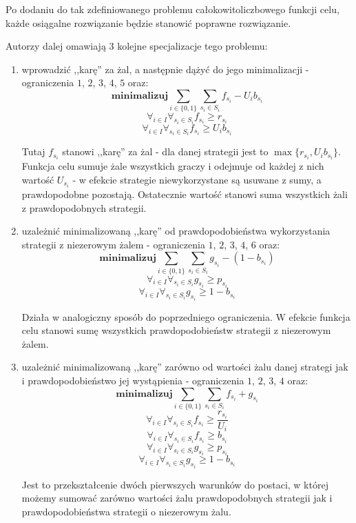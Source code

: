 \documentclass[polish]{standalone}
\begin{document}
Po dodaniu do tak zdefiniowanego problemu całokowitoliczbowego funkcji celu, każde osiągalne rozwiązanie będzie stanowić
poprawne rozwiązanie. \cite[str.~2]{SCG-NE}

Autorzy dalej omawiają 3 kolejne specjalizacje tego problemu:
\begin{enumerate}
\item wprowadzić ,,karę'' za żal, a następnie dążyć do jego minimalizacji - ograniczenia $1$, $2$, $3$, $4$, $5$ oraz:
$$\textbf{minimalizuj} \sum_{i \in \{0,1\}} \sum_{s_i \in S_i} f_{s_i} - U_i b_{s_i}$$
$$\forall_{i \in I} \forall_{s_i \in S_i} f_{s_i} \geq r_{s_i}$$
$$\forall_{i \in I} \forall_{s_i \in S_i} f_{s_i} \geq U_i b_{s_i}$$
\cite[str.~2]{SCG-NE}

Tutaj $f_{s_i}$ stanowi ,,karę'' za żal - dla danej strategii jest to $\max \{ r_{s_i}, U_i b_{s_i} \}$. Funkcja celu
sumuje żale wszystkich graczy i odejmuje od każdej z nich wartość $U_{s_i}$ - w efekcie strategie niewykorzystane są
usuwane z sumy, a prawdopodobne pozostają. Ostatecznie wartość stanowi suma wszystkich żali z prawdopodobnych strategii.
\item uzależnić minimalizowaną ,,karę'' od prawdopodobieństwa wykorzystania strategii z niezerowym żalem - ograniczenia
$1$, $2$, $3$,
$4$, $6$ oraz:
$$\textbf{minimalizuj} \sum_{i \in \{0,1\}} \sum_{s_i \in S_i} g_{s_i} - (1 - b_{s_i})$$
$$\forall_{i \in I} \forall_{s_i \in S_i} g_{s_i} \geq p_{s_i}$$
$$\forall_{i \in I} \forall_{s_i \in S_i} g_{s_i} \geq 1 - b_{s_i}$$
\cite[str.~2]{SCG-NE}

Działa w analogiczny sposób do poprzedniego ograniczenia. W efekcie funkcja celu stanowi sumę wszystkich
prawdopodobieństw strategii z niezerowym żalem.
\item uzależnić minimalizowaną ,,karę'' zarówno od wartości żalu danej strategi jak i prawdopodobieństwo jej wystąpienia
- ograniczenia $1$, $2$, $3$, $4$ oraz:
$$\textbf{minimalizuj} \sum_{i \in \{0,1\}} \sum_{s_i \in S_i} f_{s_i} + g_{s_i}$$
$$\forall_{i \in I} \forall_{s_i \in S_i} f_{s_i} \geq \frac{r_{s_i}}{U_i}$$
$$\forall_{i \in I} \forall_{s_i \in S_i} f_{s_i} \geq b_{s_i}$$
$$\forall_{i \in I} \forall_{s_i \in S_i} g_{s_i} \geq p_{s_i}$$
$$\forall_{i \in I} \forall_{s_i \in S_i} g_{s_i} \geq 1 - b_{s_i}$$
\cite[str.~2--3]{SCG-NE}

Jest to przekształcenie dwóch pierwszych warunków do postaci, w której możemy sumować zarówno wartości żalu
prawdopodobnych strategii jak i prawdopodobieństwa strategii o niezerowym żalu.
\end{enumerate}
\end{document}
